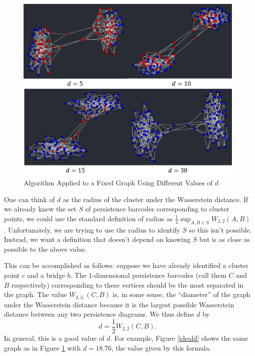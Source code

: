 \documentclass[12pt,a4paper]{amsart}
\numberwithin{equation}{section}
\theoremstyle{plain}
\theoremstyle{definition}
\begin{document}
\begin{figure}[h]
	\centering
	\includegraphics[scale=0.6]{UpperBound.jpg}
	\caption{Algorithm Applied to a Fixed Graph Using Different Values of $d$}
	\label{upperBound}
\end{figure}

\newpage

One can think of $d$ as the radius of the cluster under the Wasserstein distance. If we already knew the set $S$ of persistence barcodes corresponding to cluster points, we could use the standard definition of radius as $\frac{1}{2}\sup_{A,B \in S} W_{2,2}(A,B)$. Unfortunately, we are  trying to use the radius to identify $S$ so this isn't possible. Instead, we want a definition that doesn't depend on knowing $S$ but is as close as possible to the above value.

This can be accomplished as follows: suppose we have already identified a cluster point $c$ and a bridge $b$. The 1-dimensional persistence barcodes (call them $C$ and $B$ respectively) corresponding to these vertices should be the most separated in the graph. The value $W_{2,2,}(C,B)$ is, in some sense, the ``diameter'' of the graph under the Wasserstein distance because it is the largest possible Wasserstein distance between any two persistence diagrams. We thus define $d$ by
\[ d = \frac{1}{2} W_{2,2}(C,B). \]
In general, this is a good value of $d$. For example, Figure \ref{ideald} shows the same graph as in Figure \ref{upperBound} with $d=18.76$, the value given by this formula.
\end{document}
